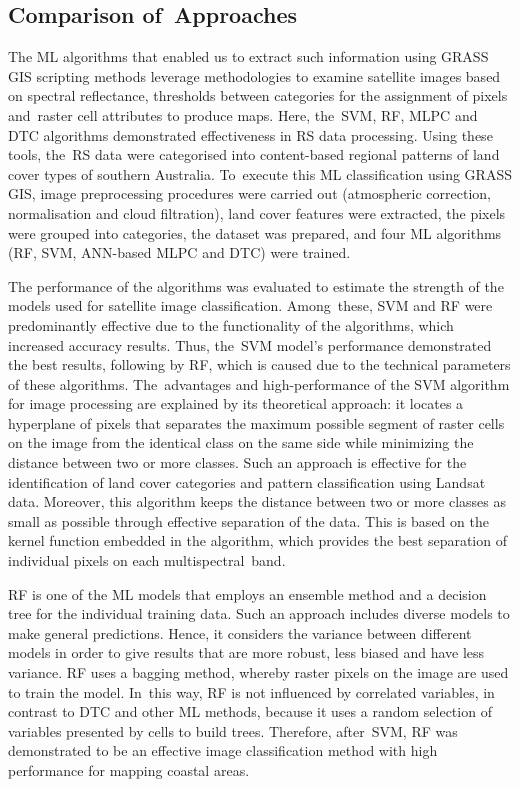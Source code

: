 \documentclass[jmse,article,accept,pdftex,oneauthor]{Definitions/mdpi}
\begin{document}
\subsection{Comparison of~Approaches}

{The ML algorithms that enabled us to extract such information using GRASS GIS scripting methods leverage methodologies to examine satellite images based on spectral reflectance, thresholds between categories for the assignment of pixels and~raster cell attributes to produce maps. Here, the~SVM, RF, MLPC and DTC algorithms demonstrated effectiveness in RS data processing. Using these tools, the~RS data were categorised into content-based regional patterns of land cover types of southern Australia. To~execute this ML classification using GRASS GIS, image preprocessing procedures were carried out (atmospheric correction, normalisation and cloud filtration), land cover features were extracted, the pixels were grouped into categories, the dataset was prepared, and four ML algorithms (RF, SVM, ANN-based MLPC and DTC) were trained. }

{The performance of the algorithms was evaluated to estimate the strength of the models used for satellite image classification. Among~these, SVM and RF were predominantly effective due to the functionality of the algorithms, which increased accuracy results. Thus, the~SVM model's performance demonstrated the best results, following by RF, which is caused due to the technical parameters of these algorithms. The~advantages and high-performance of the SVM algorithm for image processing are explained by its theoretical approach: it locates a hyperplane of pixels that separates the maximum possible segment of raster cells on the image from the identical class on the same side while minimizing the distance between two or more classes. Such an approach is effective for the identification of land cover categories and pattern classification using Landsat data. Moreover, this algorithm keeps the distance between two or more classes as small as possible through effective separation of the data. This is based on the kernel function embedded in the algorithm, which provides the best separation of individual pixels on each multispectral~band.} 

{RF is one of the ML models that employs an ensemble method and a decision tree for %
the individual training data. Such an approach includes diverse models to make general predictions. Hence, it considers the variance between different models in order to give results that are more robust, less biased and have less variance. RF uses a bagging method, whereby raster pixels on the image are used to train the model. In~this way, RF is not influenced by correlated variables, in contrast to DTC and other ML methods, %
because it uses a random selection of variables presented by cells to build trees. Therefore, after~SVM, RF was demonstrated to be an effective image classification method with high performance for mapping coastal areas.}
\end{document}
